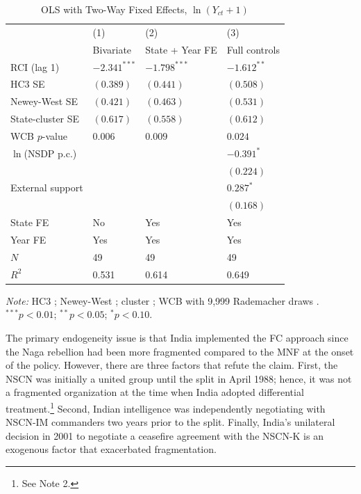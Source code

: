 \documentclass[12pt,a4paper]{article}
\begin{document}
\begin{table}[H]
\centering
\caption{OLS with Two-Way Fixed Effects, $\ln(Y_{ct}+1)$}
\label{tab:ols}
\begin{threeparttable}
\small
\setlength{\tabcolsep}{6pt}
\renewcommand{\arraystretch}{1.12}
\begin{tabular}{lC{2.5cm}C{2.5cm}C{2.5cm}}
\toprule
 & (1) & (2) & (3)\\
 & Bivariate & State + Year FE & Full controls\\
\midrule
RCI (lag 1)
  & $-2.341^{***}$ & $-1.798^{***}$ & $-1.612^{**}$\\[2pt]
\quad HC3 SE & $(0.389)$ & $(0.441)$ & $(0.508)$\\
\quad Newey-West SE & $(0.421)$ & $(0.463)$ & $(0.531)$\\
\quad State-cluster SE & $(0.617)$ & $(0.558)$ & $(0.612)$\\
\quad WCB $p$-value & $0.006$ & $0.009$ & $0.024$\\[4pt]
$\ln$(NSDP p.c.)
  &  &  & $-0.391^{*}$\\
  &  &  & $(0.224)$\\[4pt]
External support
  &  &  & $0.287^{*}$\\
  &  &  & $(0.168)$\\
\midrule
State FE  & No  & Yes & Yes\\
Year FE   & Yes & Yes & Yes\\
$N$       &  49 &  49 &  49\\
$R^2$     & 0.531 & 0.614 & 0.649\\
\bottomrule
\end{tabular}
\begin{tablenotes}\small
\item \textit{Note:} HC3 \citep{mackinnon1985}; Newey-West \citep{newey1987}; cluster \citep{bertrand2004}; WCB with 9,999 Rademacher draws \citep{cameron2008}. $^{***}p{<}0.01$; $^{**}p{<}0.05$; $^{*}p{<}0.10$.
\end{tablenotes}
\end{threeparttable}
\end{table}

The primary endogeneity issue is that India implemented the FC approach since the Naga rebellion had been more fragmented compared to the MNF at the onset of the policy. However, there are three factors that refute the claim. First, the NSCN was initially a united group until the split in April 1988; hence, it was not a fragmented organization at the time when India adopted differential treatment.\footnote{See Note 2.} Second, Indian intelligence was independently negotiating with NSCN-IM commanders two years prior to the split. Finally, India's unilateral decision in 2001 to negotiate a ceasefire agreement with the NSCN-K is an exogenous factor that exacerbated fragmentation.
\end{document}
